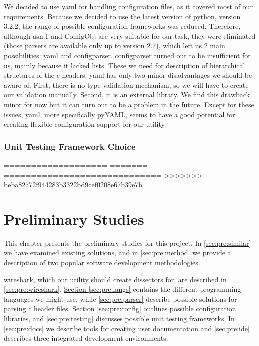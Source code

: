 We decided to use \hyperref[sec:pre:yaml]{\Gls{yaml}} for handling configuration
files, as it covered most of our requirements. Because we decided to use the
latest version of \Gls{python}, version 3.2.2, the range of possible configuration
frameworks was reduced. Therefore, although \Gls{asn.1} and ConfigObj are very
suitable for our task, they were eliminated (those \glspl{parser} are available
only up to version 2.7), which left us 2 main possibilities: \Gls{yaml} and
configparser. configparser turned out to be insufficient for us, mainly because
it lacked lists. These we need for description of hierarchical structures of
the \Gls{c} \glspl{header}. \Gls{yaml} has only two minor disadvantages we should be aware of.
First, there is no type validation mechanism, so we will have to create our
validation manually. Second, it is an external \gls{library}. We find this drawback
minor for now but it can turn out to be a problem in the future. Except for
these issues, \Gls{yaml}, more specifically pyYAML, seems to have a good potential
for creating flexible configuration support for our \gls{utility}.

\subsection{Unit Testing Framework Choice}
\label{sec:pre:testchoice}%
===================
=======
=============================
>>>>>>> beba82772f944283b3322bd9cef0208e67b39e7b
\chapter{Preliminary Studies}
This chapter presents the preliminary studies for this project.
In \autoref{sec:pre:similar} we have examined existing solutions, and in
\autoref{sec:pre:method} we provide a description of two popular software
development methodologies.

\Gls{wireshark}, which our \gls{utility} should create \glspl{dissector} for, are described in
\autoref{sec:pre:wireshark}.
\hyperref[sec:pre:langs]{Section \ref*{sec:pre:langs}} contains the different
programming languages we might use, while \autoref{sec:pre:parser}
describe possible solutions for parsing \Gls{c} \gls{header} files.
\hyperref[sec:pre:config]{Section \ref*{sec:pre:config}} outlines possible
configuration libraries, and \autoref{sec:pre:testing} discusses possible unit
testing frameworks. In \autoref{sec:pre:docs} we describe tools for creating
user documentation and \autoref{sec:pre:ide} describes three integrated
development environments.


